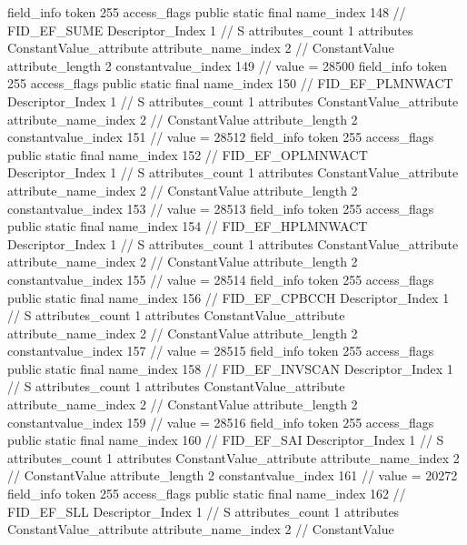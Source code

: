 {{{{{{{				}
				}
			}
			field_info {
				token	255
				access_flags	public static final
				name_index	148		// FID_EF_SUME
				Descriptor_Index	1		// S
				attributes_count	1
				attributes {
				ConstantValue_attribute {
					attribute_name_index	2		// ConstantValue
					attribute_length	2
					constantvalue_index	149		// value = 28500
				}
				}
			}
			field_info {
				token	255
				access_flags	public static final
				name_index	150		// FID_EF_PLMNWACT
				Descriptor_Index	1		// S
				attributes_count	1
				attributes {
				ConstantValue_attribute {
					attribute_name_index	2		// ConstantValue
					attribute_length	2
					constantvalue_index	151		// value = 28512
				}
				}
			}
			field_info {
				token	255
				access_flags	public static final
				name_index	152		// FID_EF_OPLMNWACT
				Descriptor_Index	1		// S
				attributes_count	1
				attributes {
				ConstantValue_attribute {
					attribute_name_index	2		// ConstantValue
					attribute_length	2
					constantvalue_index	153		// value = 28513
				}
				}
			}
			field_info {
				token	255
				access_flags	public static final
				name_index	154		// FID_EF_HPLMNWACT
				Descriptor_Index	1		// S
				attributes_count	1
				attributes {
				ConstantValue_attribute {
					attribute_name_index	2		// ConstantValue
					attribute_length	2
					constantvalue_index	155		// value = 28514
				}
				}
			}
			field_info {
				token	255
				access_flags	public static final
				name_index	156		// FID_EF_CPBCCH
				Descriptor_Index	1		// S
				attributes_count	1
				attributes {
				ConstantValue_attribute {
					attribute_name_index	2		// ConstantValue
					attribute_length	2
					constantvalue_index	157		// value = 28515
				}
				}
			}
			field_info {
				token	255
				access_flags	public static final
				name_index	158		// FID_EF_INVSCAN
				Descriptor_Index	1		// S
				attributes_count	1
				attributes {
				ConstantValue_attribute {
					attribute_name_index	2		// ConstantValue
					attribute_length	2
					constantvalue_index	159		// value = 28516
				}
				}
			}
			field_info {
				token	255
				access_flags	public static final
				name_index	160		// FID_EF_SAI
				Descriptor_Index	1		// S
				attributes_count	1
				attributes {
				ConstantValue_attribute {
					attribute_name_index	2		// ConstantValue
					attribute_length	2
					constantvalue_index	161		// value = 20272
				}
				}
			}
			field_info {
				token	255
				access_flags	public static final
				name_index	162		// FID_EF_SLL
				Descriptor_Index	1		// S
				attributes_count	1
				attributes {
				ConstantValue_attribute {
					attribute_name_index	2		// ConstantValue
}}}}}}}
